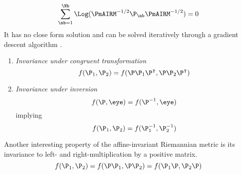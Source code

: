 \iflatexml\else {} \fi
\begin{equation}
\sum_{\nb=1}^\Nb \Log(\PmAIRM^{-1/2} \P_\nb \PmAIRM^{-1/2})=0
\label{mean_air}
\end{equation}
It has no close form solution and can be solved iteratively through a gradient descent algorithm \cite{fletcher2004principal}. 

\iflatexml\else {}  \fi
\begin{enumerate}[label=(\roman*)]
\item \emph{Invariance under congruent transformation}
\begin{equation}
f(\P_1, \P_2) = f(\P \P_1 \P^\intercal, \P \P_2 \P^\intercal)
\label{eq:invar_congr}
\end{equation}
\item \emph{Invariance under inversion}
\begin{equation}
f(\P,\eye) = f(\P^{-1},\eye)
\label{eq:invar_invers}
\end{equation}
implying
\begin{equation}
f(\P_1,\P_2) = f(\P_1^{-1},\P_2^{-1})
\label{eq:invar_invers2}
\end{equation}
\end{enumerate}
Another interesting property of the affine-invariant Riemannian metric is its invariance to left- and right-multiplication by a positive matrix.
\begin{equation}
f(\P_1, \P_2) = f(\P \P_1, \P \P_2) = f(\P_1 \P, \P_2 \P)
\label{eq:invar_mult}
\end{equation}

